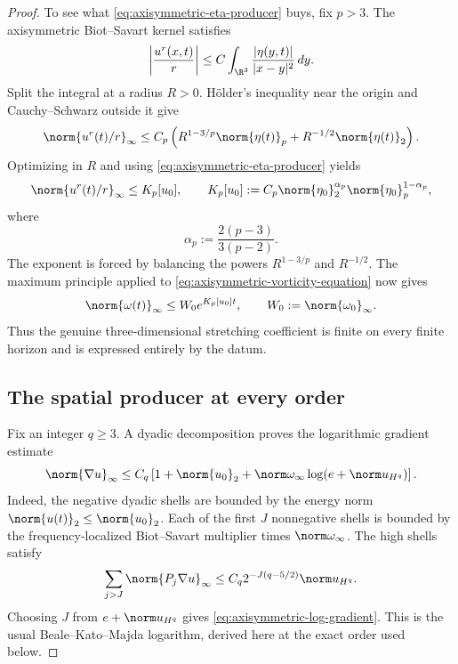 \begin{proof}
To see what \eqref{eq:axisymmetric-eta-producer} buys, fix \(p>3\).  The
axisymmetric Biot--Savart kernel satisfies
\begin{equation}
 \left|\frac{u^r(x,t)}{r}\right|
 \le C\int_{\R^3}\frac{|\eta(y,t)|}{|x-y|^2}\,dy.
 \label{eq:axisymmetric-biotsavart-pointwise}
\end{equation}
Split the integral at a radius \(R>0\).  H\"older's inequality near the
origin and Cauchy--Schwarz outside it give
\begin{equation}
 \norm{u^r(t)/r}_\infty
 \le C_p\left(
 R^{1-3/p}\norm{\eta(t)}_p
 +R^{-1/2}\norm{\eta(t)}_2
 \right).
 \label{eq:axisymmetric-biotsavart-split}
\end{equation}
Optimizing in \(R\) and using
\eqref{eq:axisymmetric-eta-producer} yields
\begin{equation}
 \norm{u^r(t)/r}_\infty
 \le K_p[u_0],
 \qquad
 K_p[u_0]
 :=C_p\norm{\eta_0}_2^{\alpha_p}
       \norm{\eta_0}_p^{1-\alpha_p},
 \label{eq:axisymmetric-stretching-coefficient}
\end{equation}
where
\begin{equation}
 \alpha_p:=\frac{2(p-3)}{3(p-2)}.
 \label{eq:axisymmetric-interpolation-exponent}
\end{equation}
The exponent is forced by balancing the powers
\(R^{1-3/p}\) and \(R^{-1/2}\).  The maximum principle applied to
\eqref{eq:axisymmetric-vorticity-equation} now gives
\begin{equation}
 \norm{\omega(t)}_\infty
 \le W_0e^{K_p[u_0]t},
 \qquad W_0:=\norm{\omega_0}_\infty.
 \label{eq:axisymmetric-vorticity-envelope}
\end{equation}
Thus the genuine three-dimensional stretching coefficient is finite on every
finite horizon and is expressed entirely by the datum.

\subsection{The spatial producer at every order}

Fix an integer \(q\ge3\).  A dyadic decomposition proves the logarithmic
gradient estimate
\begin{equation}
 \norm{\nabla u}_\infty
 \le C_q\left[
  1+\norm{u_0}_2
  +\norm\omega_\infty
   \log\!\left(e+\norm u_{H^q}\right)
 \right].
 \label{eq:axisymmetric-log-gradient}
\end{equation}
Indeed, the negative dyadic shells are bounded by the energy norm
\(\norm{u(t)}_2\le\norm{u_0}_2\).  Each of the first \(J\) nonnegative
shells is bounded by the frequency-localized Biot--Savart multiplier times
\(\norm\omega_\infty\).  The high shells satisfy
\[
 \sum_{j>J}\norm{P_j\nabla u}_\infty
 \le C_q2^{-J(q-5/2)}\norm u_{H^q}.
\]
Choosing \(J\) from \(e+\norm u_{H^q}\) gives
\eqref{eq:axisymmetric-log-gradient}.  This is the usual
Beale--Kato--Majda logarithm, derived here at the exact order used below.


\end{proof}
